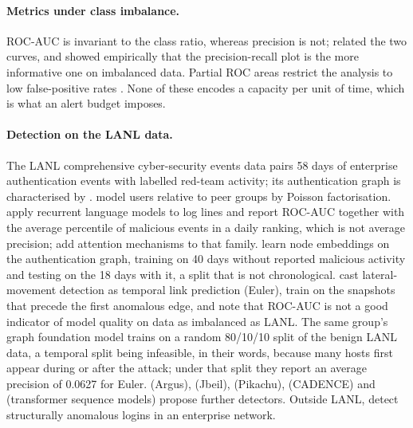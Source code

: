 \documentclass[11pt,a4paper]{article}
\begin{document}
\paragraph{Metrics under class imbalance.}
ROC-AUC is invariant to the class ratio, whereas precision is not; \textcite{davis2006} related the two curves, and \textcite{saito2015} showed empirically that the precision-recall plot is the more informative one on imbalanced data. Partial ROC areas restrict the analysis to low false-positive rates \parencite{mcclish1989}. None of these encodes a capacity per unit of time, which is what an alert budget imposes.

\paragraph{Detection on the LANL data.}
The LANL comprehensive cyber-security events data \parencite{kent2015dataset,kent2016chapter} pairs 58 days of enterprise authentication events with labelled red-team activity; its authentication graph is characterised by \textcite{kent2015authgraphs}. \textcite{turcotte2016} model users relative to peer groups by Poisson factorisation. \textcite{tuor2018} apply recurrent language models to log lines and report ROC-AUC together with the average percentile of malicious events in a daily ranking, which is not average precision; \textcite{brown2018} add attention mechanisms to that family. \textcite{bowman2020} learn node embeddings on the authentication graph, training on 40 days without reported malicious activity and testing on the 18 days with it, a split that is not chronological. \textcite{king2022euler,king2023euler} cast lateral-movement detection as temporal link prediction (Euler), train on the snapshots that precede the first anomalous edge, and note that ROC-AUC is not a good indicator of model quality on data as imbalanced as LANL. The same group's graph foundation model \parencite{king2026cybergfm} trains on a random 80/10/10 split of the benign LANL data, a temporal split being infeasible, in their words, because many hosts first appear during or after the attack; under that split they report an average precision of 0.0627 for Euler. \textcite{xu2024argus} (Argus), \textcite{khoury2024jbeil} (Jbeil), \textcite{paudel2022pikachu} (Pikachu), \textcite{amin2019cadence} (CADENCE) and \textcite{gokstorp2024} (transformer sequence models) propose further detectors. Outside LANL, \textcite{siadati2017} detect structurally anomalous logins in an enterprise network.
\end{document}
